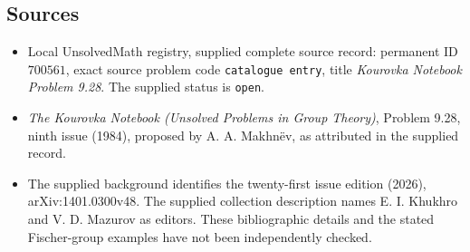 \documentclass[11pt]{article}
\begin{document}
\subsection{Sources}
\begin{itemize}
\item Local UnsolvedMath registry, supplied complete source record: permanent ID \(700561\), exact source problem code \texttt{catalogue entry}, title \emph{Kourovka Notebook Problem 9.28}. The supplied status is \texttt{open}.
\item \emph{The Kourovka Notebook (Unsolved Problems in Group Theory)}, Problem 9.28, ninth issue (1984), proposed by A. A. Makhn\"ev, as attributed in the supplied record.
\item The supplied background identifies the twenty-first issue edition (2026), arXiv:1401.0300v48. The supplied collection description names E. I. Khukhro and V. D. Mazurov as editors. These bibliographic details and the stated Fischer-group examples have not been independently checked.
\end{itemize}
\end{document}
